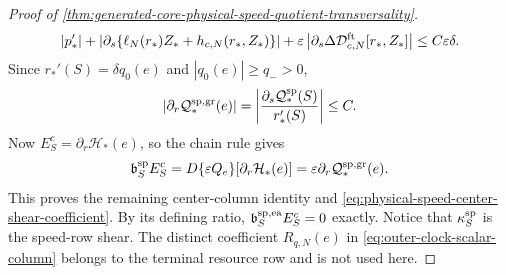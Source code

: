 \begin{proof}[Proof of
\cref{thm:generated-core-physical-speed-quotient-transversality}]
\begin{equation}
 |p_*'|
 +\left|\partial_s\{\ell_N(r_*)Z_*+
                   h_{c,N}(r_*,Z_*)\}\right|
 +\varepsilon\left|\partial_s
       \Delta\mathcal D_{c,N}^{\rm ft}[r_*,Z_*]\right|
 \le C\varepsilon\delta .                       \label{eq:proof-physical-speed-Q-terminal-ledger}
\end{equation}
Since \(r_*'(S)=\delta q_0(e)\) and \(|q_0(e)|\ge q_->0\),
\begin{equation}
 |\partial_r\mathcal Q_*^{\rm sp,gr}(e)|
 =\left|\frac{\partial_s\mathcal Q_*^{\rm sp}(S)}
                    {r_*'(S)}\right|
 \le C.                                         \label{eq:proof-physical-speed-Q-r-jet}
\end{equation}
Now \(E_S^c=\partial_r\mathcal H_*(e)\), so the chain rule gives
\[
 \mathfrak b_S^{\rm sp}E_S^c
 =D\{\varepsilon Q_e\}[\partial_r\mathcal H_*(e)]
 =\varepsilon\partial_r\mathcal Q_*^{\rm sp,gr}(e).
\]
This proves the remaining center-column identity and
\cref{eq:physical-speed-center-shear-coefficient}.  By its defining ratio,
\(\mathfrak b_S^{\rm sp,ea}E_S^c=0\) exactly.  Notice that
\(\kappa_S^{\rm sp}\) is the speed-row shear.  The distinct coefficient
\(R_{q,N}(e)\) in \cref{eq:outer-clock-scalar-column} belongs to the
terminal resource row and is not used here.


\end{proof}
